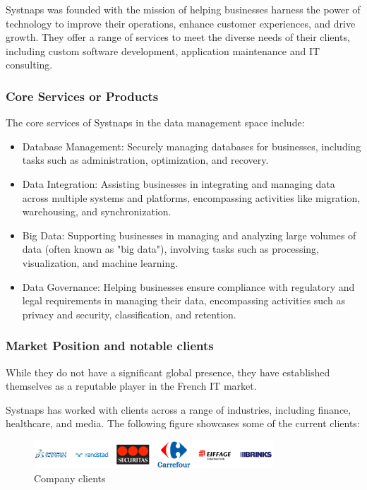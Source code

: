 Systnaps was founded with the mission of helping businesses harness the power of technology to improve their operations, enhance customer experiences, and drive growth. They offer a range of services to meet the diverse needs of their clients, including custom software development, application maintenance and IT consulting. 

\subsubsection{Core Services or Products }

The core services of Systnaps in the data management space include: 
\begin{itemize}[label={--}]
    \item Database Management: Securely managing databases for businesses, including tasks such as administration, optimization, and recovery. 

\item Data Integration: Assisting businesses in integrating and managing data across multiple systems and platforms, encompassing activities like migration, warehousing, and synchronization. 

\item Big Data: Supporting businesses in managing and analyzing large volumes of data (often known as "big data"), involving tasks such as processing, visualization, and machine learning. 

\item  Data Governance: Helping businesses ensure compliance with regulatory and legal requirements in managing their data, encompassing activities such as privacy and security, classification, and retention. 

 \end{itemize}

\subsubsection{Market Position and notable clients }

While they do not have a significant global presence, they have established themselves as a reputable player in the French IT market. 

Systnaps has worked with clients across a range of industries, including finance, healthcare, and media. The following figure showcases some of the current clients: 


\begin{figure}[!ht]\centering
\includegraphics[width=0.8\textwidth,angle=00]{assets/fc.png}
\caption{Company clients}
\end{figure}


